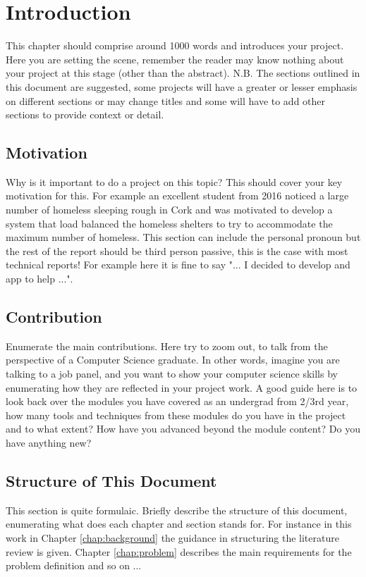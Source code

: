 \chapter{Introduction}
\label{chap:intro}
This chapter should comprise around 1000 words and introduces your project. Here you are setting the scene, remember the reader may know nothing about your project at this stage (other than the abstract). N.B. The sections outlined in this document are suggested, some projects will have a greater or lesser emphasis on different sections or may change titles and some will have to add other sections to provide context or detail.

\section{Motivation}
Why is it important to do a project on this topic? This should cover your key motivation for this. For example an excellent student from 2016 noticed a large number of homeless sleeping rough in Cork and was motivated to develop a system that load balanced the homeless shelters to try to accommodate the maximum number of homeless. This section can include the personal pronoun but the rest of the report should be third person passive, this is the case with most technical reports! For example here it is fine to say "... I decided to develop and app to help ...".

\section{Contribution}
Enumerate the main contributions. Here try to zoom out, to talk from the perspective of a Computer Science graduate. In other words, imagine you are talking to a job panel, and you want to show your computer science skills by enumerating how they are reflected in your project work. A good guide here is to look back over the modules you have covered as an undergrad from 2/3rd year, how many tools and techniques from these modules do you have in the project and to what extent? How have you advanced beyond the module content? Do you have anything new?

\section{Structure of This Document}
This section is quite formulaic. Briefly describe the structure of this document, enumerating what does each chapter and section stands for. For instance in this work in Chapter \ref{chap:background} the guidance in structuring the literature review is given. Chapter \ref{chap:problem} describes the main requirements for the problem definition and so on ...